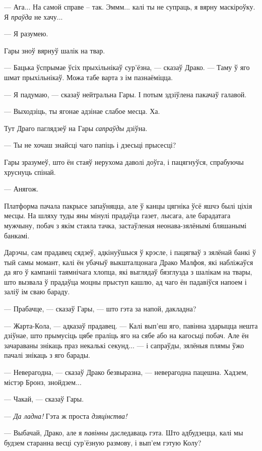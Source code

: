 --- Ага... На самой справе -- так. Эммм... калі ты не супраць, я вярну маскіроўку.
Я \emph{праўда} не хачу... 

--- Я разумею.

Гары зноў вярнуў шалік на твар.

--- Бацька ўспрымае ўсіх прыхільнікаў сур'ёзна, --- сказаў Драко. --- Таму 
ў яго шмат прыхільнікаў. Можа табе варта з ім пазнаёміцца.

--- Я падумаю, --- сказаў нейтральна Гары. І потым здзіўлена пакачаў галавой. 

--- Выходзіць, ты ягонае адзінае слабое месца. Ха.

Тут Драго паглядзеў на Гары \emph{сапраўды} дзіўна.

--- Ты не хочаш знайсці чаго папіць і дзесьці прысесці?

Гары зразумеў, што ён стаяў нерухома даволі доўга, і пацягнуўся, спрабуючы хруснуць 
спінай. 

--- Анягож.

Платформа пачала пакрысе запаўняцца, але ў канцы цягніка ўсё яшчэ былі ціхія месцы.
На шляху туды яны мінулі прадаўца газет, лысага, але барадатага мужчыну, побач з якім
стаяла тачка, застаўленая неонава-зялёнымі бляшанымі банкамі. 

Дарэчы, сам прадавец сядзеў, адкінуўшыся ў крэсле, і пацягваў з зялёнай банкі 
ў тый самы момант, калі ён убачыў выкшталцонага Драко Малфоя, які набліжаўся 
да яго ў кампаніі таямнічага хлопца, які выглядаў бязглузда з шалікам на твары,
што вызвала ў прадаўца моцны прыступ кашлю, ад чаго ён падавіўся напоем і заліў ім
сваю бараду.

--- Прабачце, --- сказаў Гары, --- што гэта за напой, дакладна?

--- Жарта-Кола, --- адказаў прадавец. --- Калі вып'еш яго, павінна здарыцца нешта
дзіўнае, што прымусіць цябе праліць яго на сябе або на кагосьці побач. Але ён зачараваны
знікаць праз некалькі секунд... --- і сапраўды, зялёныя плямы ўжо пачалі знікаць з 
яго барады.

--- Неверагодна, --- сказаў Драко безвыразна, --- неверагодна пацешна. Хадзем, містэр Бронз, 
знойдзем...

--- Чакай, --- сказаў Гары.

--- \emph{Да ладна!} Гэта ж проста \emph{дзяцінства!}

--- Выбачай, Драко, але я \emph{павінны} даследаваць гэта. Што адбудзецца, калі
мы будзем старанна весці сур'ёзную размову, і вып'ем гэтую Колу?

